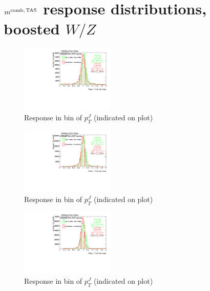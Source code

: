 \clearpage
\onecolumn
\vspace*{\fill}
\section{$m^\textrm{comb,\,TAS}$ response distributions, boosted $W/Z$}
\vfill
\clearpage
\twocolumn
 \clearpage %
\begin{figure}

\includegraphics[width=0.4\textwidth]{appendixB/mTASCOMB_W_calibmCal_030ro_20:38:43-03-11-2016/8ResponsePTJ_h_JetRatio_mJ01CALO.pdf}
\caption{Response in bin of  $p_{T}^{J}$ (indicated on plot)} 

\end{figure}

\begin{figure}

\includegraphics[width=0.4\textwidth]{appendixB/mTASCOMB_W_calibmCal_030ro_20:38:43-03-11-2016/8ResponsePTJ_h_JetRatio_mJ02CALO.pdf}
\caption{Response in bin of  $p_{T}^{J}$ (indicated on plot)} 

\end{figure}

\begin{figure}

\includegraphics[width=0.4\textwidth]{appendixB/mTASCOMB_W_calibmCal_030ro_20:38:43-03-11-2016/8ResponsePTJ_h_JetRatio_mJ03CALO.pdf}
\caption{Response in bin of  $p_{T}^{J}$ (indicated on plot)} 

\end{figure}

